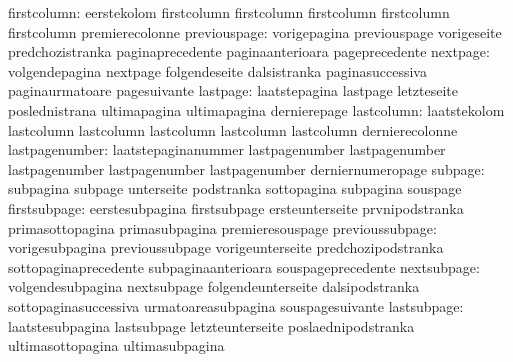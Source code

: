               firstcolumn: eerstekolom               firstcolumn
                           firstcolumn               firstcolumn
                           firstcolumn               firstcolumn
                           premierecolonne
             previouspage: vorigepagina              previouspage
                           vorigeseite               predchozistranka
                           paginaprecedente          paginaanterioara
                           pageprecedente
                 nextpage: volgendepagina            nextpage
                           folgendeseite             dalsistranka
                           paginasuccessiva          paginaurmatoare
                           pagesuivante
                 lastpage: laatstepagina             lastpage
                           letzteseite               poslednistrana
                           ultimapagina              ultimapagina
                           dernierepage
               lastcolumn: laatstekolom              lastcolumn
                           lastcolumn                lastcolumn
                           lastcolumn                lastcolumn
                           dernierecolonne
           lastpagenumber: laatstepaginanummer       lastpagenumber
                           lastpagenumber            lastpagenumber
                           lastpagenumber            lastpagenumber
                           derniernumeropage
                  subpage: subpagina                 subpage
                           unterseite                podstranka
                           sottopagina               subpagina
                           souspage
             firstsubpage: eerstesubpagina           firstsubpage
                           ersteunterseite           prvnipodstranka
                           primasottopagina          primasubpagina
                           premieresouspage
          previoussubpage: vorigesubpagina           previoussubpage
                           vorigeunterseite          predchozipodstranka
                           sottopaginaprecedente     subpaginaanterioara
                           souspageprecedente
              nextsubpage: volgendesubpagina         nextsubpage
                           folgendeunterseite        dalsipodstranka
                           sottopaginasuccessiva     urmatoareasubpagina
                           souspagesuivante
              lastsubpage: laatstesubpagina          lastsubpage
                           letzteunterseite          poslaednipodstranka
                           ultimasottopagina         ultimasubpagina
